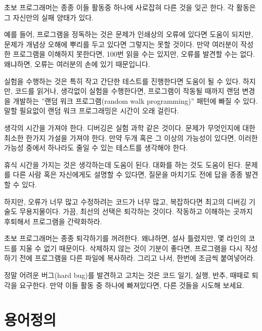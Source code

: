 초보 프로그래머는 종종 이들 활동중 하나에 사로잡혀 다른 것을 잊곤 한다. 각 활동은 그 자신만의 실패 양태가 있다.


예를 들어, 프로그램을 정독하는 것은 문제가 인쇄상의 오류에 있다면 도움이 되지만, 문제가 개념상 오해에 뿌리를 두고 있다면
그렇지는 못할 것이다. 만약 여러분이 작성한 프로그램을 이해하지 못한다면, 100번 읽을 수는 있지만, 오류를 발견할 수는 없다.
왜냐하면, 오류는 여러분의 손에 있기 때문입니다.


실험을 수행하는 것은 특히 작고 간단한 테스트를 진행한다면 도움이 될 수 있다.
하지만, 코드를 읽거나, 생각없이 실험을 수행한다면, 프로그램이 작동될 때까지 랜덤 변경을 개발하는 ''랜덤 워크 프로그램(random walk programming)''
패턴에 빠질 수 있다. 말할 필요없이 랜덤 워크 프로그래밍은 시간이 오래 걸린다.


생각의 시간을 가져야 한다. 디버깅은 실험 과학 같은 것이다. 문제가 무엇인지에 대한 최소한 한가지 가설을 가져야 한다.
만약 두개 혹은 그 이상의 가능성이 있다면, 이러한 가능성 중에서 하나라도 줄일 수 있는 테스트를 생각해야 한다.

휴식 시간을 가지는 것은 생각하는데 도움이 된다. 대화를 하는 것도 도움이 된다.
문제를 다른 사람 혹은 자신에게도 설명할 수 있다면, 질문을 마치기도 전에 답을 종종 발견할 수 있다.

하지만, 오류가 너무 많고 수정하려는 코드가 너무 많고, 복잡하다면 최고의 디버깅 기술도 무용지물이다.
가끔, 최선의 선택은 퇴각하는 것이다. 작동하고 이해하는 곳까지 후퇴해서 프로그램을 간략화하라.

초보 프로그래머는 종종 퇴각하기를 꺼려한다. 왜냐하면, 설사 틀렸지만, 몇 라인의 코드를 지울 수 없기 때문이다.
삭제하지 않는 것이 기분이 좋다면, 프로그램을 다시 작성하기 전에 프로그램을 다른 파일에 복사하라.
그리고 나서, 한번에 조금씩 붙여넣어라. 

정말 어려운 버그(hard bug)를 발견하고 고치는 것은 코드 일기, 실행, 반추, 때때로 퇴각을 요구한다.
만약 이들 활동 중 하나에 빠져있다면, 다른 것들을 시도해 보세요.

\section{용어정의}

